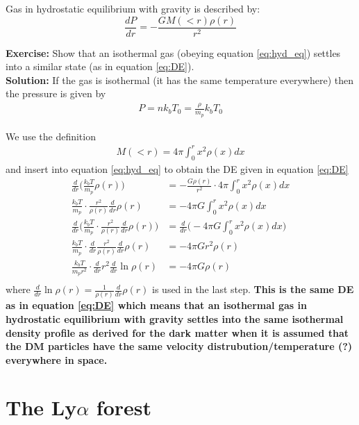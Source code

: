 \documentclass[paper=a4, fontsize=11pt]{scrartcl} %
\numberwithin{figure}{section} %
\numberwithin{table}{section} %
\begin{document}
Gas in hydrostatic equilibrium with gravity is described by:
\begin{equation}
\frac{dP}{dr} = -\frac{GM(<r) \rho(r)}{r^2}
\label{eq:hyd_eq}
\end{equation}

\textbf{Exercise:} Show that an isothermal gas (obeying equation \ref{eq:hyd_eq}) settles into a similar state (as in equation \ref{eq:DE}).\\

\textbf{Solution:} If the gas is isothermal (it has the same temperature everywhere) then the pressure is given by
\begin{align*}
P = nk_bT_0 = \frac{\rho}{m_p}k_bT_0
\end{align*}

We use the definition
\begin{align*}
M(<r) = 4\pi \int_0^r x^2 \rho (x) dx
\end{align*}
and insert into equation \ref{eq:hyd_eq} to obtain the DE given in equation \ref{eq:DE}
\begin{align*}
\frac{d}{dr}\Bigg( \frac{k_bT}{m_p} \rho(r) \Bigg) &= -\frac{G\rho(r)}{r^2} \cdot 4\pi \int_0^r x^2 \rho (x) dx \\
\frac{k_bT}{m_p} \cdot \frac{r^2}{\rho(r)} \frac{d}{dr}  \rho(r)  &= - 4\pi G \int_0^r x^2 \rho (x) dx \\
\frac{d}{dr} \Bigg( \frac{k_bT}{m_p} \cdot \frac{r^2}{\rho(r)} \frac{d}{dr}  \rho(r) \Bigg)  &= \frac{d}{dr} \Bigg( - 4\pi G \int_0^r x^2 \rho (x) dx \Bigg) \\
\frac{k_bT}{m_p} \cdot \frac{d}{dr} \frac{r^2}{\rho(r)} \frac{d}{dr}  \rho(r) &= - 4\pi G  r^2 \rho (r)  \\
\frac{k_bT}{m_pr^2} \cdot \frac{d}{dr} r^2 \frac{d}{dr} \ln \rho(r) &= - 4\pi G  \rho (r)  \\
\end{align*}
where $\frac{d}{dr} \ln \rho(r) = \frac{1}{\rho(r)}\frac{d}{dr}\rho(r)$ is used in the last step. \textbf{This is the same DE as in equation \ref{eq:DE} which means that an isothermal gas in hydrostatic equilibrium with gravity settles into the same isothermal density profile as derived for the dark matter when it is assumed that the DM particles have the same velocity distrubution/temperature (?) everywhere in space. }



\section{The Ly$\alpha$ forest}










\end{document}
